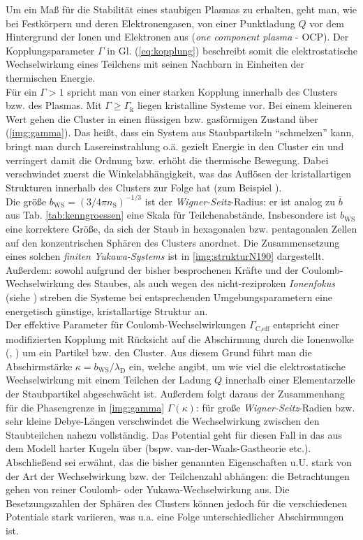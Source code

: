 \documentclass[numbers=noenddot,a4paper]{scrartcl}
\newcommand{\ix}[1]{_\text{#1}}
\newcommand{\tilt}[1]{\textit{#1}}
\begin{document}
                    Um ein Maß für die Stabilität eines staubigen Plasmas zu erhalten, geht man, wie bei Festkörpern und deren Elektronengasen, von einer Punktladung $Q$ vor dem Hintergrund der Ionen und Elektronen aus (\tilt{one component plasma} - OCP). Der Kopplungsparameter $\Gamma$ in Gl. (\ref{eq:kopplung}) beschreibt somit die elektrostatische Wechselwirkung eines Teilchens mit seinen Nachbarn in Einheiten der thermischen Energie.\\
					Für ein $\Gamma>1$ spricht man von einer starken Kopplung innerhalb des Clusters bzw. des Plasmas. Mit $\Gamma\geq\Gamma\ix{k}$ liegen kristalline Systeme vor. Bei einem kleineren Wert gehen die Cluster in einen flüssigen bzw. gasförmigen Zustand über (\ref{img:gamma}). Das heißt, dass ein System aus Staubpartikeln "`schmelzen"' kann, bringt man durch Lasereinstrahlung o.ä. gezielt Energie in den Cluster ein und verringert damit die Ordnung bzw. erhöht die thermische Bewegung. Dabei verschwindet zuerst die Winkelabhängigkeit, was das Auflösen der kristallartigen Strukturen innerhalb des Clusters zur Folge hat (zum Beispiel \cite{Thomas96}).\\
					Die größe $b\ix{WS}=\left(3/4\pi n\ix{S}\right)^{-1/3}$ ist der \tilt{Wigner-Seitz}-Radius: er ist analog zu $\overline{b}$ aus Tab. \ref{tab:kenngroessen} eine Skala für Teilchenabstände. Insbesondere ist $b\ix{WS}$ eine korrektere Größe, da sich der Staub in hexagonalen bzw. pentagonalen Zellen auf den konzentrischen Sphären des Clusters anordnet. Die Zusammensetzung eines solchen \tilt{finiten Yukawa-Systems} ist in \ref{img:strukturN190} dargestellt. Außerdem: sowohl aufgrund der bisher besprochenen Kräfte und der Coulomb-Wechselwirkung des Staubes, als auch wegen des nicht-reziproken \tilt{Ionenfokus} (siehe \cite{Melzer95c}) streben die Systeme bei entsprechenden Umgebungsparametern eine energetisch günstige, kristallartige Struktur an. \\
					Der effektive Parameter für Coulomb-Wechselwirkungen $\Gamma\ix{C,eff}$ entspricht einer modifizierten Kopplung mit Rücksicht auf die Abschirmung durch die Ionenwolke (\cite{Lampe00}, \cite{Schweigert00d}) um ein Partikel bzw. den Cluster. Aus diesem Grund führt man die Abschirmstärke $\kappa=b\ix{WS}/\lambda\ix{D}$ ein, welche angibt, um wie viel die elektrostatische Wechselwirkung mit einem Teilchen der Ladung $Q$ innerhalb einer Elementarzelle der Staubpartikel abgeschwächt ist. Außerdem folgt daraus der Zusammenhang für die Phasengrenze in \ref{img:gamma} $\Gamma\left(\kappa\right)$: für große \tilt{Wigner-Seitz}-Radien bzw. sehr kleine Debye-Längen verschwindet die Wechselwirkung zwischen den Staubteilchen nahezu vollständig. Das Potential geht für diesen Fall in das aus dem Modell harter Kugeln über (bspw. van-der-Waals-Gastheorie etc.).\\
					Abschließend sei erwähnt, das die bisher genannten Eigenschaften u.U. stark von der Art der Wechselwirkung bzw. der Teilchenzahl abhängen: die Betrachtungen gehen von reiner Coulomb- oder Yukawa-Wechselwirkung aus. Die Besetzungszahlen der Sphären des Clusters können jedoch für die verschiedenen Potentiale stark variieren, was u.a. eine Folge unterschiedlicher Abschirmungen ist.
\end{document}
